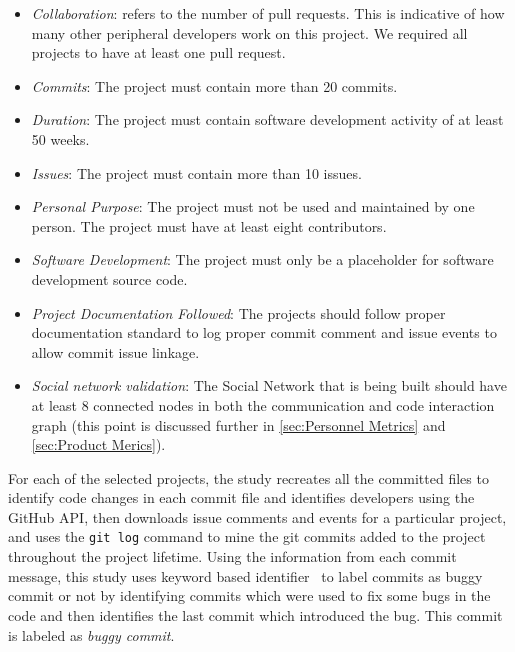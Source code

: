 \documentclass[smallextended]{svjour3}
\begin{document}
\begin{itemize}
    \item {\textit{{Collaboration}}: refers to the  number of pull requests. This is indicative of how many other peripheral developers work on this project. We required all  projects to have at least one pull request.}
    \item {\textit{{Commits}}: The project must contain more than 20 commits.}
    \item {\textit{{Duration}}: The project must contain software development activity of at least 50 weeks.}
    \item {\textit{{Issues}}: The project must contain more than 10 issues.}
    \item {\textit{{Personal Purpose}}: The project must not be used and maintained by one person. The project must have at least eight contributors.}
    \item {\textit{{Software Development}}: The project must only be a placeholder for software development source code.}
    \item {\textit{Project Documentation Followed}: The projects should follow proper documentation standard to log proper commit comment and issue events to allow commit issue linkage.}
    \item {\textit{Social network validation}:  The Social Network that is being built should have at least 8 connected nodes in both the communication and code interaction graph (this point is discussed further in \ref{sec:Personnel Metrics} and \ref{sec:Product Merics}).}
\end{itemize}




For each of the selected projects, the study recreates all the committed files to identify code changes in each commit file and identifies developers using the GitHub API, then downloads issue comments and events for a particular project, and uses the {\tt git log}
command to mine the git commits added to the project throughout the project lifetime. Using the information from each commit message, this study uses keyword based identifier~\cite{rosen2015commit,hindle2008large,vasilescu2015quality} to label commits as buggy commit or not by identifying commits which were used to fix some bugs in the code and then  identifies the last commit which introduced the bug. This commit is labeled as \textit{buggy commit}.
\end{document}
